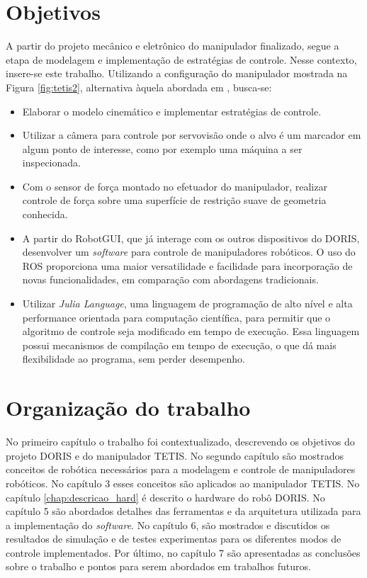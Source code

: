 \section{Objetivos}
A partir do projeto mecânico e eletrônico do manipulador finalizado, segue a etapa de modelagem e implementação de estratégias de controle. 
Nesse contexto, insere-se este trabalho. Utilizando a configuração do manipulador mostrada na Figura \ref{fig:tetis2}, alternativa àquela abordada em \citep{xaud2016doris},  busca-se:
\begin{itemize}
\item Elaborar o modelo cinemático e implementar estratégias de controle. %

\item Utilizar a câmera para controle por servovisão onde o alvo é um marcador em algum ponto de interesse, como por exemplo uma máquina a ser inspecionada. 

\item Com o sensor de força montado no efetuador do manipulador, realizar controle de força sobre uma superfície de restrição suave de geometria conhecida.

\item A partir do RobotGUI, que já interage com os outros dispositivos do DORIS, desenvolver um \textit{software} para controle de manipuladores robóticos. O uso do ROS proporciona uma maior versatilidade e facilidade para incorporação de novas funcionalidades, em comparação com abordagens tradicionais.

\item Utilizar \textit{Julia Language}, uma linguagem de programação de alto nível e alta performance orientada para computação científica, para permitir que o algoritmo de controle seja modificado em tempo de execução. Essa linguagem possui mecanismos de compilação em tempo de execução, o que dá mais flexibilidade ao programa, sem perder desempenho.
\end{itemize}


\section{Organização do trabalho}

No primeiro capítulo o trabalho foi contextualizado, descrevendo os objetivos do projeto DORIS e do manipulador TETIS. No segundo capítulo são mostrados conceitos de robótica necessários para a modelagem e controle de manipuladores robóticos. No capítulo 3 esses conceitos são aplicados ao manipulador TETIS.
No capítulo \ref{chap:descricao_hard} é descrito o hardware do robô DORIS.  No capítulo 5 são abordados detalhes das ferramentas e da arquitetura utilizada para a implementação do \textit{software}. No capítulo 6, são mostrados e discutidos os resultados de simulação e de testes experimentas para os diferentes modos de controle implementados.  Por último, no capítulo 7 são apresentadas as conclusões sobre o trabalho e pontos para serem abordados em trabalhos futuros.

